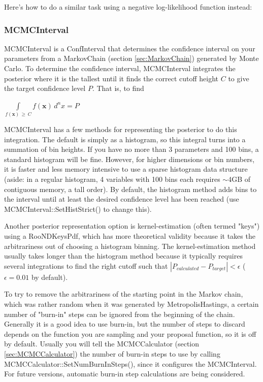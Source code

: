 \documentclass[11pt]{article}
\begin{document}
	
	
	Here's how to do a similar task using a negative log-likelihood function instead:
	
	
	
	\subsubsection{MCMCInterval}
	\label{sec:MCMCInterval}
	MCMCInterval is a ConfInterval that determines the confidence interval on your parameters from a MarkovChain (section \ref{sec:MarkovChain}) generated by Monte Carlo.  To determine the confidence interval, MCMCInterval integrates the posterior where it is the tallest until it finds the correct cutoff height $C$ to give the target confidence level $P$.  That is, to find
	\begin{center}
	$\displaystyle \int\limits_{f(\mathbf{x}) \, \ge \, C} f(\mathbf{x}) \,d^nx = P$
	\end{center}
	MCMCInterval has a few methods for representing the posterior to do this integration.  The default is simply as a histogram, so this integral turns into a summation of bin heights.  If you have no more than 3 parameters and 100 bins, a standard histogram will be fine.  However, for higher dimensions or bin numbers, it is faster and less memory intensive to use a sparse histogram data structure (aside: in a regular histogram, 4 variables with 100 bins each requires $\sim$4GB of contiguous memory, a tall order).  By default, the histogram method adds bins to the interval until at least the desired confidence level has been reached (use MCMCInterval::SetHistStrict() to change this).
	
	Another posterior representation option is kernel-estimation (often termed "keys") using a RooNDKeysPdf, which has more theoretical validity because it takes the arbitrariness out of choosing a histogram binning.  The kernel-estimation method usually takes longer than the histogram method because it typically requires several integrations to find the right cutoff such that $|P_{calculated} - P_{target}| < \epsilon$ ($\epsilon = 0.01$ by default).
	
	To try to remove the arbitrariness of the starting point in the Markov chain, which was rather random when it was generated by MetropolisHastings, a certain number of "burn-in" steps can be ignored from the beginning of the chain.  Generally it is a good idea to use burn-in, but the number of steps to discard depends on the function you are sampling and your proposal function, so it is off by default.  Usually you will tell the MCMCCalculator (section \ref{sec:MCMCCalculator}) the number of burn-in steps to use by calling MCMCCalculator::SetNumBurnInSteps(), since it configures the MCMCInterval.  For future versions, automatic burn-in step calculations are being considered.
	
\end{document}
